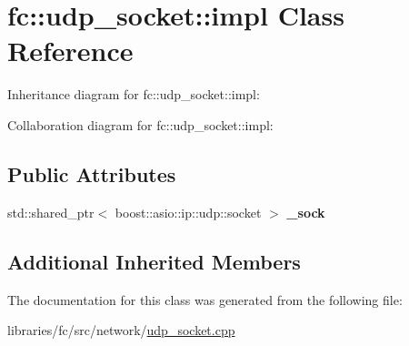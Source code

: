 \hypertarget{classfc_1_1udp__socket_1_1impl}{}\section{fc\+:\+:udp\+\_\+socket\+:\+:impl Class Reference}
\label{classfc_1_1udp__socket_1_1impl}


Inheritance diagram for fc\+:\+:udp\+\_\+socket\+:\+:impl\+:


Collaboration diagram for fc\+:\+:udp\+\_\+socket\+:\+:impl\+:
\subsection*{Public Attributes}
\begin{DoxyCompactItemize}
\item 
\mbox{\label{classfc_1_1udp__socket_1_1impl_ac3eda8ddac53c88ade8470bd4cce374b}} 
std\+::shared\+\_\+ptr$<$ boost\+::asio\+::ip\+::udp\+::socket $>$ {\bfseries \+\_\+sock}
\end{DoxyCompactItemize}
\subsection*{Additional Inherited Members}


The documentation for this class was generated from the following file\+:\begin{DoxyCompactItemize}
\item 
libraries/fc/src/network/\mbox{\hyperlink{udp__socket_8cpp}{udp\+\_\+socket.\+cpp}}\end{DoxyCompactItemize}
